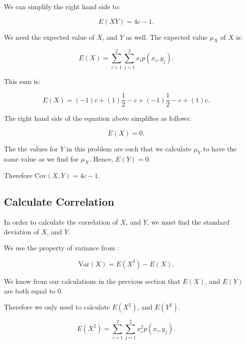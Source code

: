 \documentclass[a5paper,11pt]{article}
\begin{document}
We can simplify the right hand side to:

\begin{equation}
E\left(XY\right)=
4c - 1.
\end{equation}

We need the expected value of $X$, and
$Y$ as well. The expected value $\mu_X$
of $X$ is:

\begin{equation}
E\left(X\right) =
\sum_{i=1}^{2} \sum_{j=1}^2 
x_i p\left(x_i, y_j \right).
\end{equation} 

This sum is:

\begin{equation}
E\left(X\right) =
\left(-1\right) c +
\left(1\right) \frac{1}{2} - c+
\left(-1\right) \frac{1}{2} - c+
\left(1\right) c. 
\end{equation} 

The right hand side of the equation above
simplifies as follows:

\begin{equation}
E\left(X\right) =
0.
\end{equation}

The the values for $Y$ in this problem are
such that we calculate $\mu_Y$ to have
the same value as we find for $\mu_X$. 
Hence, $E\left(Y\right)=0$.

Therefore Cov$\left(X,Y\right)=4c-1$.

\subsection{Calculate Correlation}
In order to calculate the correlation of
$X$, and $Y$, we must find the standard
deviation of $X$, and $Y$.

We use the property of variance from
\cite{reading5a}:

\begin{equation}
\text{Var}\left(X\right) =
E\left(X^2\right) -
E\left(X\right).
\end{equation}

We know from our calculations in the 
previous section that $E\left(X\right)$,
and $E\left(Y\right)$ are both equal to
$0$.

Therefore we only need to calculate 
$E\left(X^2\right)$, and 
$E\left(Y^2\right)$.

\begin{equation}
E\left(X^2\right) =
\sum_{i=1}^{2} \sum_{j=1}^2 
x_i^2 p\left(x_i, y_j \right).
\end{equation} 
\end{document}
